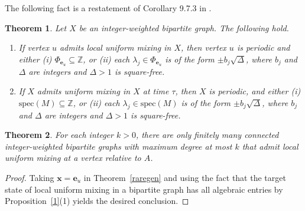 \documentclass[11pt]{article}
\newtheorem{theorem}{Theorem}
\newcommand{\be}{\mathbf e}
\newcommand{\bx}{\mathbf x}
\newcommand\spec{{\mathrm{spec}}}
\newcommand{\supp}{{\Phi}}
\def\Z{\mathbb{Z}}
\begin{document}
The following fact is a restatement of Corollary 9.7.3 in \cite{Coutinho2021}.

\begin{theorem}
Let $X$ be an integer-weighted bipartite graph. The following hold.
\begin{enumerate}
\item If vertex $u$ admits local uniform mixing in $X$, then vertex $u$ is periodic and either
(i) $\supp_{\be_u}\subseteq\Z$, or (ii) each $\lambda_j\in\supp_{\be_u}$ is of the form $\pm b_j\sqrt{\Delta}$, where $b_j$ and $\Delta$ are integers and $\Delta>1$ is square-free.
\item If $X$ admits uniform mixing in $X$ at time $\tau$, then $X$ is periodic, and either (i) $\spec(M)\subseteq\Z$, or (ii) each $\lambda_j\in\spec(M)$ is of the form $\pm b_j\sqrt{\Delta}$, where $b_j$ and $\Delta$ are integers and $\Delta>1$ is square-free.
\end{enumerate}
\end{theorem}


\begin{theorem}
\label{raregenA}
For each integer $k>0$, there are only finitely many connected integer-weighted bipartite graphs with maximum degree at most $k$ that admit local uniform mixing at a vertex relative to $A$.
\end{theorem}

\begin{proof}
Taking $\bx=\be_u$ in Theorem~\ref{raregen} and using the fact that the target state of local uniform mixing in a bipartite graph has all algebraic entries by Proposition~\ref{1}(1) yields the desired conclusion.
\end{proof}
\end{document}
